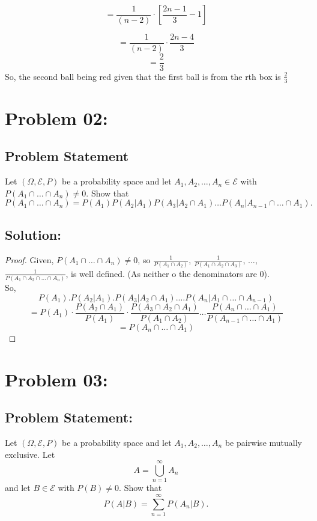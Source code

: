 \documentclass{article}
\theoremstyle{definition}
\begin{document}
\[
= \frac{1}{(n-2)} \cdot  [\frac{2n-1}{3} - 1]
\]

\[
= \frac{1}{(n-2)} \cdot \frac{2n-4}{3}
\]
\[
= \frac{2}{3}
\]
So, the second ball being red given that the first ball is from the rth box is $\frac{2}{3}$

\vspace{0.5cm}
\section{Problem 02:}
\begin{mdframed}[style = MyFrame]
\subsection{Problem Statement}
Let $(\Omega, \mathcal{E}, P)$ be a probability space and let $A_1, A_2, \ldots, A_n \in \mathcal{E}$ with $P(A_1 \cap \ldots \cap A_n) \neq 0$. Show that 
\[ P(A_1 \cap \ldots \cap A_n) = P(A_1)P(A_2|A_1)P(A_3|A_2\cap A_1)\ldots P(A_n|A_{n-1}\cap\ldots\cap A_1).  \]
\end{mdframed}

\subsection{Solution:}
\begin{proof}
 Given, $P(A_1 \cap \ldots \cap A_n) \neq 0$, so $\frac{1}{P(A_1 \cap A_2)}$, $\frac{1}{P(A_1 \cap A_2 \cap A_3)}$, $\dots$, $\frac{1}{P(A_1 \cap A_2 \cap \dots \cap A_n)}$, is well defined. (As neither o the denominators are 0).\\
 So,
 \[
 P(A_1).P(A_2|A_1). P(A_3| A_2 \cap A_1). \dots P(A_n | A_1 \cap \dots \cap A_{n-1})
 \]
 \[
 = P(A_1) \cdot \frac{P(A_2 \cap A_1)}{P(A_1)} \cdot \frac{P(A_3 \cap A_2 \cap A_1)}{P(A_1 \cap A_2)} \dots \frac{P(A_{n} \cap \dots \cap A_1)}{P(A_{n-1} \cap \dots \cap A_1)}
 \]
 \[
 = P(A_{n} \cap \dots \cap A_1)
 \]

\end{proof}

\section{Problem 03:}


\begin{mdframed}[style = MyFrame]

\subsection{Problem Statement:}
Let $(\Omega, \mathcal{E}, P)$ be a probability space and let $A_1, A_2, \ldots , A_n$ be pairwise mutually exclusive. Let 
\[A = \bigcup_{n=1}^{\infty}A_n\] 
and let $B \in \mathcal{E}$ with $P(B) \neq 0$. Show that 
\[P(A|B) = \sum_{n=1}^{\infty} P(A_n|B).\]
\end{mdframed}
\end{document}

